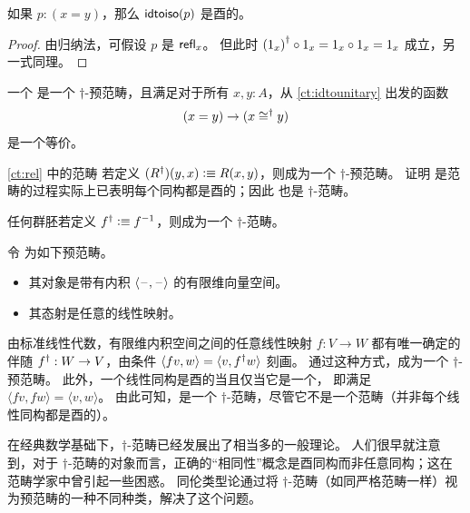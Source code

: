 \begin{lem}\label{ct:idtounitary}
  如果 $p:(x=y)$，那么 $\mathsf{idtoiso}(p)$ 是酉的。
\end{lem}

\begin{proof}
  由归纳法，可假设 $p$ 是 $\mathsf{refl}_{x}$。
  但此时 ${(1_x)}^{\dagger} \circ 1_x = 1_x\circ 1_x = 1_x$ 成立，另一式同理。
\end{proof}

\begin{defn}\label{ct:dagger-category}
  一个
  是一个 $\dagger$-预范畴，且满足对于所有 $x,y:A$，从 \cref{ct:idtounitary} 出发的函数
  \[ (x=y) \to (x \mathrel{\cong^\dagger} y) \]
  是一个等价。
\end{defn}

\begin{eg}\label{ct:rel-dagger-cat}
  \cref{ct:rel} 中的范畴 \urel 若定义 $({R}^{\dagger})(y,x) \vcentcolon\equiv R(x,y)$，则成为一个 $\dagger$-预范畴。
  证明 \urel 是范畴的过程实际上已表明每个同构都是酉的；因此 \urel 也是 $\dagger$-范畴。
\end{eg}

\begin{eg}\label{ct:groupoid-dagger-cat}
  任何群胚若定义 ${f}^{\dagger} \vcentcolon\equiv {f}^{-1}$，则成为一个 $\dagger$-范畴。
\end{eg}

\begin{eg}\label{ct:hilb}
  令 \uhilb 为如下预范畴。
  \begin{itemize}
  \item 其对象是带有内积 $\langle \mathord{\hspace{1pt}\text{--}\hspace{1pt}},\mathord{\hspace{1pt}\text{--}\hspace{1pt}}\rangle$ 的有限维向量空间。
  \item 其态射是任意的线性映射。
  \end{itemize}
  由标准线性代数，有限维内积空间之间的任意线性映射 $f:V\to W$ 都有唯一确定的伴随 ${f}^{\dagger}:W\to V$，由条件 $\langle f v,w\rangle = \langle v,{f}^{\dagger} w\rangle$ 刻画。
  通过这种方式，\uhilb 成为一个 $\dagger$-预范畴。
  此外，一个线性同构是酉的当且仅当它是一个，
  即满足 $\langle fv,fw\rangle = \langle v,w\rangle$。
  由此可知，\uhilb 是一个 $\dagger$-范畴，尽管它不是一个范畴（并非每个线性同构都是酉的）。
\end{eg}

在经典数学基础下，$\dagger$-范畴已经发展出了相当多的一般理论。
人们很早就注意到，对于 $\dagger$-范畴的对象而言，正确的``相同性''概念是酉同构而非任意同构；这在范畴学家中曾引起一些困惑。
同伦类型论通过将 $\dagger$-范畴（如同严格范畴一样）视为预范畴的一种不同种类，解决了这个问题。

